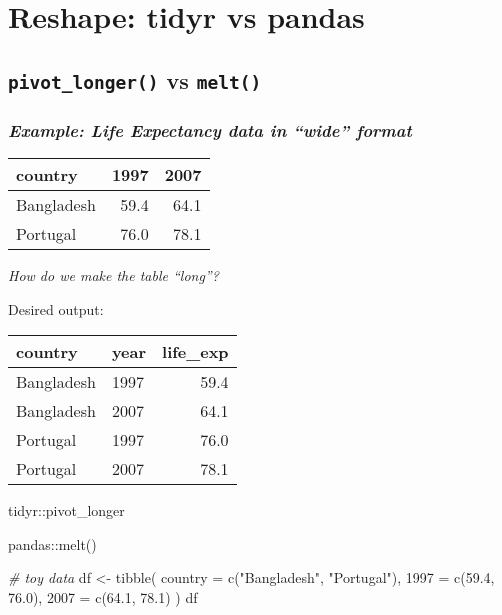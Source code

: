 \documentclass[
]{book}
\newenvironment{Shaded}{\begin{snugshade}}{\end{snugshade}}
\newcommand{\AttributeTok}[1]{\textcolor[rgb]{0.77,0.63,0.00}{#1}}
\newcommand{\CommentTok}[1]{\textcolor[rgb]{0.56,0.35,0.01}{\textit{#1}}}
\newcommand{\FloatTok}[1]{\textcolor[rgb]{0.00,0.00,0.81}{#1}}
\newcommand{\FunctionTok}[1]{\textcolor[rgb]{0.00,0.00,0.00}{#1}}
\newcommand{\NormalTok}[1]{#1}
\newcommand{\OtherTok}[1]{\textcolor[rgb]{0.56,0.35,0.01}{#1}}
\newcommand{\StringTok}[1]{\textcolor[rgb]{0.31,0.60,0.02}{#1}}
\begin{document}
\hypertarget{reshape-tidyr-vs-pandas}{%
\chapter{Reshape: tidyr vs pandas}\label{reshape-tidyr-vs-pandas}}

\hypertarget{pivot_longer-vs-melt}{%
\section{\texorpdfstring{\texttt{pivot\_longer()} vs \texttt{melt()}}{pivot\_longer() vs melt()}}\label{pivot_longer-vs-melt}}

\hypertarget{example-life-expectancy-data-in-wide-format}{%
\subsection{\texorpdfstring{\emph{Example: Life Expectancy data in ``wide'' format}}{Example: Life Expectancy data in ``wide'' format}}\label{example-life-expectancy-data-in-wide-format}}

\begin{longtable}[]{@{}lrr@{}}
\toprule
country & 1997 & 2007 \\
\midrule
\endhead
Bangladesh & 59.4 & 64.1 \\
Portugal & 76.0 & 78.1 \\
\bottomrule
\end{longtable}

{\emph{How do we make the table ``long''?}}

Desired output:

\begin{longtable}[]{@{}llr@{}}
\toprule
country & year & life\_exp \\
\midrule
\endhead
Bangladesh & 1997 & 59.4 \\
Bangladesh & 2007 & 64.1 \\
Portugal & 1997 & 76.0 \\
Portugal & 2007 & 78.1 \\
\bottomrule
\end{longtable}

tidyr::pivot\_longer

pandas::melt()

\begin{Shaded}
\begin{Highlighting}[]
\CommentTok{\# toy data}
\NormalTok{df }\OtherTok{\textless{}{-}} \FunctionTok{tibble}\NormalTok{(}
  \AttributeTok{country =} \FunctionTok{c}\NormalTok{(}\StringTok{"Bangladesh"}\NormalTok{, }\StringTok{"Portugal"}\NormalTok{),}
  \StringTok{\textasciigrave{}}\AttributeTok{1997}\StringTok{\textasciigrave{}} \OtherTok{=} \FunctionTok{c}\NormalTok{(}\FloatTok{59.4}\NormalTok{, }\FloatTok{76.0}\NormalTok{),}
  \StringTok{\textasciigrave{}}\AttributeTok{2007}\StringTok{\textasciigrave{}} \OtherTok{=} \FunctionTok{c}\NormalTok{(}\FloatTok{64.1}\NormalTok{, }\FloatTok{78.1}\NormalTok{)}
\NormalTok{  )}
\NormalTok{df}
\end{Highlighting}
\end{Shaded}
\end{document}
